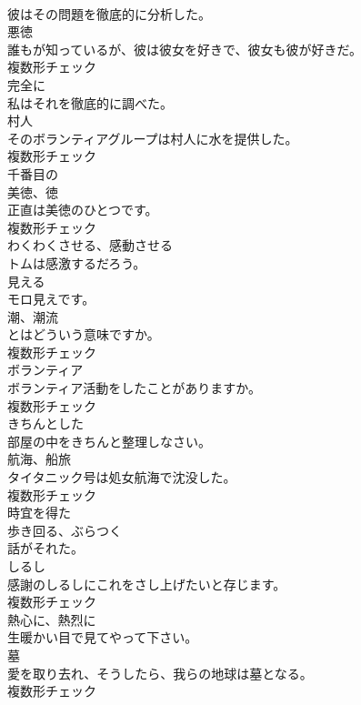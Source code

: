 \documentclass[8pt]{extreport}
\begin{document}
\begin{CJK}{UTF8}{min}
\\	彼はその問題を徹底的に分析した。	
\\	[名詞]	悪徳	
\\	誰もが知っているが、彼は彼女を好きで、彼女も彼が好きだ。	
\\	複数形チェック
\\	[副詞]	完全に	
\\	私はそれを徹底的に調べた。	
\\	[名詞]	村人	
\\	そのボランティアグループは村人に水を提供した。	
\\	複数形チェック
\\	[形容詞]	千番目の	
\\	[名詞]	美徳、徳	
\\	正直は美徳のひとつです。	
\\	複数形チェック
\\	[動詞]	わくわくさせる、感動させる	
\\	トムは感激するだろう。	
\\	[形容詞]	見える	
\\	モロ見えです。	
\\	[名詞]	潮、潮流	
\\	とはどういう意味ですか。	
\\	複数形チェック
\\	[名詞]	ボランティア	
\\	ボランティア活動をしたことがありますか。	
\\	複数形チェック
\\	[形容詞]	きちんとした	
\\	部屋の中をきちんと整理しなさい。	
\\	[名詞]	航海、船旅	
\\	タイタニック号は処女航海で沈没した。	
\\	複数形チェック
\\	[形容詞]	時宜を得た	
\\	[動詞]	歩き回る、ぶらつく	
\\	話がそれた。	
\\	[名詞]	しるし	
\\	感謝のしるしにこれをさし上げたいと存じます。	
\\	複数形チェック
\\	[副詞]	熱心に、熱烈に	
\\	生暖かい目で見てやって下さい。	
\\	[名詞]	墓	
\\	愛を取り去れ、そうしたら、我らの地球は墓となる。	
\\	複数形チェック

\end{CJK}
\end{document}
